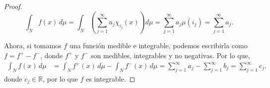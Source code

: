 \begin{itemize}
\begin{itemize}
\begin{proof}
\[
\int_N f(x) \, d\mu = \int_N \left( \sum_{j=1}^{\infty} a_j \chi_{i_j}(x) \right) d\mu = \sum_{j=1}^{\infty} a_j \mu(i_j) = \sum_{j=1}^{\infty} a_j.
\]

Ahora, si tomamos \( f \) una función medible e integrable, podemos escribirla como \( f = f^+ - f^- \), donde \( f^+ \) y \( f^- \) son medibles, integrables y no negativas. Por lo que,
\begin{align*}
 \int_N f(x) \, d\mu &= \int_N f^+(x) \, d\mu - \int_N f^-(x) \, d\mu = \sum_{j=1}^{\infty} a_j - \sum_{j=1}^{\infty} b_j = \sum_{j=1}^{\infty} c_j 
.\end{align*}
donde $c_j \in \mathbb{R}$, por lo que  $f$ es integrable.


    
\end{proof}

\end{itemize}
\end{itemize}